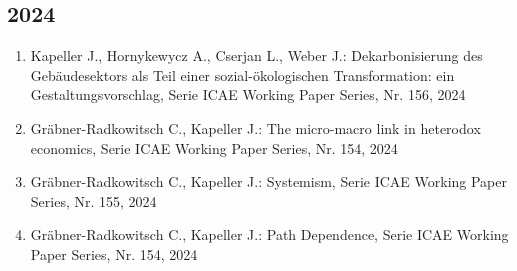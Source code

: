 \subsection*{2024}
\begin{enumerate}
    	 \item Kapeller J., Hornykewycz A., Cserjan L., Weber J.: Dekarbonisierung des Gebäudesektors als Teil einer sozial-ökologischen Transformation: ein Gestaltungsvorschlag, Serie ICAE Working Paper Series, Nr. 156, 2024
	 \item Gräbner-Radkowitsch C., Kapeller J.: The micro-macro link in heterodox economics, Serie ICAE Working Paper Series, Nr. 154, 2024
	 \item Gräbner-Radkowitsch C., Kapeller J.: Systemism, Serie ICAE Working Paper Series, Nr. 155, 2024
	 \item Gräbner-Radkowitsch C., Kapeller J.: Path Dependence, Serie ICAE Working Paper Series, Nr. 154, 2024
\end{enumerate}
